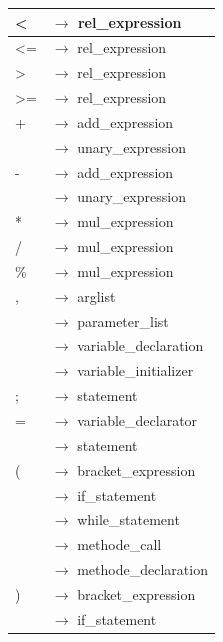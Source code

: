 \documentclass[10pt,a4paper,titlepage]{article}
\begin{document}
\begin{ttfamily}
\begin{tabular}{| l  l |}
\hspace*{1.5cm}< & $\to$ rel\_expression\\\hline
\hspace*{1.5cm}<= & $\to$ rel\_expression\\\hline
\hspace*{1.5cm}> & $\to$ rel\_expression\\\hline
\hspace*{1.5cm}>= & $\to$ rel\_expression\\\hline
\hspace*{1.5cm}+ & $\to$ add\_expression\\
 & $\to$ unary\_expression \\\hline
\hspace*{1.5cm}- & $\to$ add\_expression\\
 & $\to$ unary\_expression \\\hline
\hspace*{1.5cm}* & $\to$ mul\_expression\\\hline
\hspace*{1.5cm}/ & $\to$ mul\_expression\\\hline
\hspace*{1.5cm}\% & $\to$ mul\_expression\\\hline
\hspace*{1.5cm}, & $\to$ arglist \\
 & $\to$ parameter\_list \\
 & $\to$ variable\_declaration \\
 & $\to$ variable\_initializer\\\hline
\hspace*{1.5cm}; & $\to$ statement \\\hline
\hspace*{1.5cm}= & $\to$ variable\_declarator\\
 & $\to$ statement \\\hline
\hspace*{1.5cm}( & $\to$ bracket\_expression \\
 & $\to$ if\_statement \\
 & $\to$ while\_statement\\
 & $\to$ methode\_call \\
 & $\to$ methode\_declaration \hspace*{5cm}\\\hline
\hspace*{1.5cm}) & $\to$ bracket\_expression \\
 & $\to$ if\_statement \\

\end{tabular}
\end{ttfamily}
\end{document}
